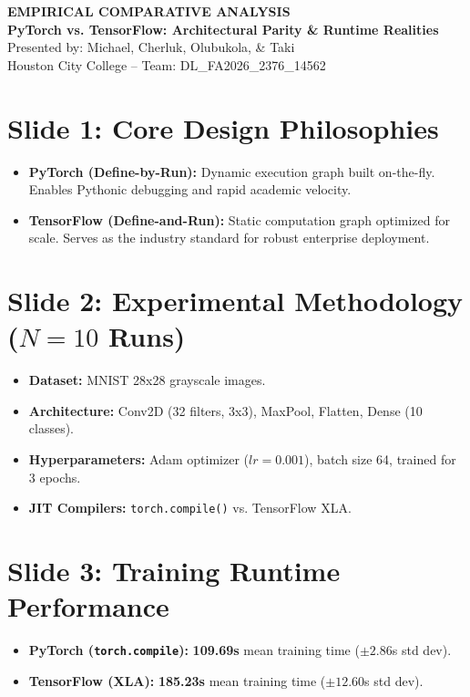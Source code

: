 \documentclass[11pt, a4paper]{article}
\begin{document}
\begin{center}
    {\LARGE \textbf{\color{textdark}EMPIRICAL COMPARATIVE ANALYSIS}} \\[0.4em]
    {\Large \color{accentcolor}\textbf{PyTorch vs. TensorFlow: Architectural Parity \& Runtime Realities}} \\[0.6em]
    {\normalsize \color{textmuted}Presented by: Michael, Cherluk, Olubukola, \& Taki \\ Houston City College -- Team: DL\_FA2026\_2376\_14562}
\end{center}

\vspace{1.5em}

\section*{Slide 1: Core Design Philosophies}
\begin{itemize}
    \item \textbf{PyTorch (Define-by-Run):} Dynamic execution graph built on-the-fly. Enables Pythonic debugging and rapid academic velocity.
    \item \textbf{TensorFlow (Define-and-Run):} Static computation graph optimized for scale. Serves as the industry standard for robust enterprise deployment.
\end{itemize}

\section*{Slide 2: Experimental Methodology ($N=10$ Runs)}
\begin{itemize}
    \item \textbf{Dataset:} MNIST 28x28 grayscale images.
    \item \textbf{Architecture:} Conv2D (32 filters, 3x3), MaxPool, Flatten, Dense (10 classes).
    \item \textbf{Hyperparameters:} Adam optimizer ($lr=0.001$), batch size 64, trained for 3 epochs.
    \item \textbf{JIT Compilers:} \texttt{torch.compile()} vs. TensorFlow XLA.
\end{itemize}

\section*{Slide 3: Training Runtime Performance}
\begin{itemize}
    \item \textbf{PyTorch (\texttt{torch.compile}):} \textbf{109.69s} mean training time ($\pm 2.86$s std dev).
    \item \textbf{TensorFlow (XLA):} \textbf{185.23s} mean training time ($\pm 12.60$s std dev).
\end{itemize}
\end{document}
